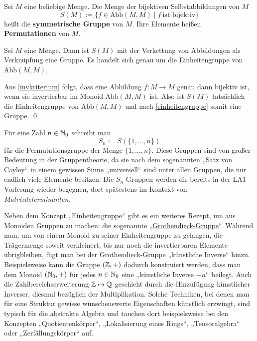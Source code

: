 \begin{de}[Permutationsgruppe]
 Sei $M$ eine beliebige Menge. Die Menge der bijektiven Selbstabbildungen von $M$
 \[ S(M) := \{f\in \text{Abb}(M,M)\mid f\ \text{ist bijektiv} \} \]
 heißt die \textbf{symmetrische Gruppe} von $M$. Ihre Elemente heißen \textbf{Permutationen} von $M$.
\end{de}


\begin{sat}
 Sei $M$ eine Menge. Dann ist $S(M)$ mit der Verkettung von Abbildungen als Verknüpfung eine Gruppe. Es handelt sich genau um die Einheitengruppe von $\text{Abb}(M,M)$.
\end{sat}
\begin{bew}
 Aus \cref{invkriterium} folgt, dass eine Abbildung $f:M\to M$ genau dann bijektiv ist, wenn sie invertierbar im Monoid $\text{Abb}(M,M)$ ist. Also ist $S(M)$ tatsächlich die Einheitengruppe von $\text{Abb}(M,M)$ und nach \cref{einheitengruppe} somit eine Gruppe. \qed
\end{bew}




\begin{bem}
 Für eine Zahl $n\in {\mathbb N}_0$ schreibt man
 \[ S_n := S(\{1,\dots , n\}) \]
 für die Permutationsgruppe der Menge $\{1,\dots , n\}$. Diese Gruppen sind von großer Bedeutung in der Gruppentheorie, da sie nach dem sogenannten „\href{https://de.wikipedia.org/wiki/Satz_von_Cayley}{Satz von Cayley}“ in einem gewissen Sinne „universell“ sind unter allen Gruppen, die nur endlich viele Elemente besitzen. Die $S_n$-Gruppen werden dir bereits in der LA1-Vorlesung wieder begegnen, dort spätestens im Kontext von \emph{Matrixdeterminanten}.
\end{bem}




\begin{bem}
 Neben dem Konzept „Einheitengruppe“ gibt es ein weiteres Rezept, um aus Monoiden Gruppen zu machen: die sogenannte „\href{https://de.wikipedia.org/wiki/Grothendieck-Gruppe}{Grothendieck-Gruppe}“. Während man, um von einem Monoid zu seiner Einheitengruppe zu gelangen, die Trägermenge soweit verkleinert, bis nur noch die invertierbaren Elemente übrigbleiben, fügt man bei der Grothendieck-Gruppe „künstliche Inverse“ hinzu. Beispielsweise kann die Gruppe $({\mathbb Z},+)$ dadurch konstruiert werden, dass man dem Monoid $({\mathbb N}_0,+)$ für jedes $n\in {\mathbb N}_0$ eine „künstliche Inverse $-n$“ beilegt. Auch die Zahlbereichserweiterung ${\mathbb Z} \mapsto {\mathbb Q}$ geschieht durch die Hinzufügung künstlicher Inverser, diesmal bezüglich der Multiplikation. Solche Techniken, bei denen man für eine Struktur gewisse wünschenswerte Eigenschaften künstlich erzwingt, sind typisch für die abstrakte Algebra und tauchen dort beispielsweise bei den Konzepten „Quotientenkörper“, „Lokalisierung eines Rings“, „Tensoralgebra“ oder „Zerfällungskörper“ auf.
\end{bem}






